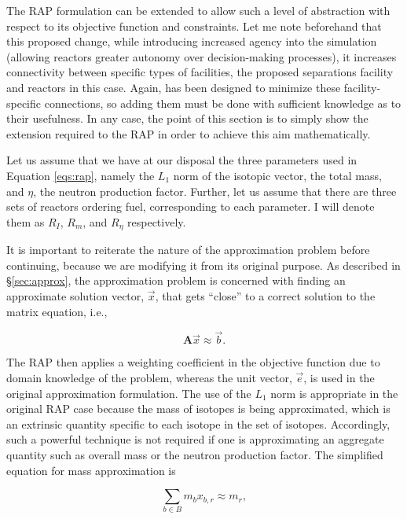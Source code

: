 The RAP formulation can be extended to allow such a level of abstraction with
respect to its objective function and constraints. Let me note beforehand that
this proposed change, while introducing increased agency into the simulation
(allowing reactors greater autonomy over decision-making processes), it
increases connectivity between specific types of facilities, the proposed
separations facility and reactors in this case. Again, \Cyclus has been designed
to minimize these facility-specific connections, so adding them must be done
with sufficient knowledge as to their usefulness. In any case, the point of this
section is to simply show the extension required to the RAP in order to achieve
this aim mathematically.

Let us assume that we have at our disposal the three parameters used in Equation
\ref{eqs:rap}, namely the $L_1$ norm of the isotopic vector, the total mass, and
$\eta$, the neutron production factor. Further, let us assume that there are
three sets of reactors ordering fuel, corresponding to each parameter. I will
denote them as $R_I$, $R_m$, and $R_\eta$ respectively. 

It is important to reiterate the nature of the approximation problem before
continuing, because we are modifying it from its original purpose. As described
in \S\ref{sec:approx}, the approximation problem is concerned with finding an
approximate solution vector, $\vec{x}$, that gets ``close'' to a correct
solution to the matrix equation, i.e., 

\begin{equation*}
  \mathbf{A} \vec{x} \approx \vec{b}.
\end{equation*}

The RAP then applies a weighting coefficient in the objective function due to
domain knowledge of the problem, whereas the unit vector, $\vec{e}$, is used in
the original approximation formulation. The use of the $L_1$ norm is appropriate
in the original RAP case because the mass of isotopes is being approximated,
which is an extrinsic quantity specific to each isotope in the set of
isotopes. Accordingly, such a powerful technique is not required if one is
approximating an aggregate quantity such as overall mass or the neutron
production factor. The simplified equation for mass approximation is

\begin{equation*}
  \sum_{b \in B} m_{b} x_{b,r} \approx m_{r},
\end{equation*}

